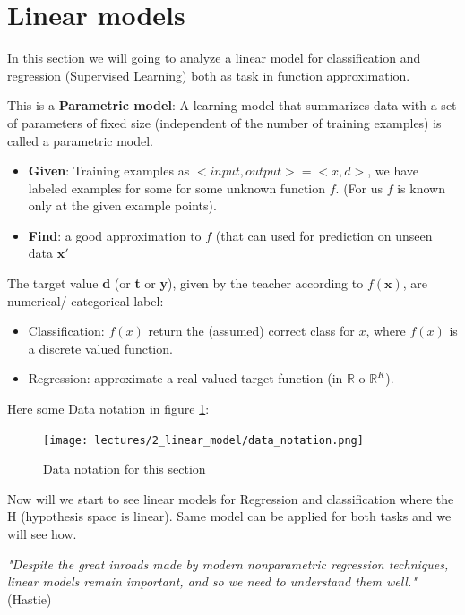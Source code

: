 \documentclass[../main.tex]{subfiles}
\begin{document}
\section{Linear models}
In this section we will going to analyze a linear model for classification and regression (Supervised Learning) both as task in function approximation. 

This is a \textbf{Parametric model}: A learning model that summarizes data with a set of parameters of fixed size (independent of the number of training examples) is called a parametric model.
\begin{itemize}
    \item \textbf{Given}: Training examples as $<input,output>=<x,d>$, we have labeled examples for some for some unknown function $f$. (For us $f$ is known only at the given example points).
    
    \item \textbf{Find}: a good approximation to $f$ (that can used for prediction on unseen data $\mathbf{x}'$
\end{itemize}

The target value \textbf{d} (or \textbf{t} or \textbf{y}), given by the teacher according to $f(\textbf{x})$, are numerical/ categorical label:
\begin{itemize}
    \item Classification: $f(x)$ return the (assumed) correct class for $x$, where $f(x)$ is a discrete valued function.
    
    \item Regression:  approximate a real-valued target function (in $\mathbb{R}$ o $\mathbb{R}^K$).
\end{itemize}

Here some Data notation in figure \ref{fig:data_notation}:
\begin{figure}[H]
    \centering
    \texttt{[image: lectures/2\_linear\_model/data\_notation.png]}
    \caption{Data notation for this section}
    \label{fig:data_notation}
\end{figure}

Now will we start to see linear models for Regression and classification where the H (hypothesis space is linear). Same model can be applied for both tasks and we will see how.

\begin{flushright}
\textit{"Despite the great inroads made by modern nonparametric regression techniques, linear models remain important, and so we need to understand them well."} (Hastie)
\end{flushright}
\end{document}

